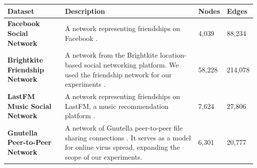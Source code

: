 \documentclass[9pt]{extarticle}
\begin{document}
\begin{table}[H]
    \centering
    \small
    \begin{tabularx}{\textwidth}{|l|X|l|l|}
        \hline
        \textbf{Dataset} & \textbf{Description} & \textbf{Nodes} & \textbf{Edges} \\ \hline
        \textbf{Facebook Social Network} \cite{facebookdata} & A network representing friendships on Facebook \cite{leskovec2012learning}. & 4,039 & 88,234 \\ \hline
        \textbf{Brightkite Friendship Network} \cite{brightkitedata} & A network from the Brightkite location-based social networking platform. We used the friendship network for our experiments \cite{cho2011friendship}. & 58,228 & 214,078 \\ \hline
        \textbf{LastFM Music Social Network} \cite{lastfmdata} & A network representing friendships on LastFM, a music recommendation platform \cite{feather}. & 7,624 & 27,806 \\ \hline
        \textbf{Gnutella Peer-to-Peer Network} \cite{gnutelladata} & A network of Gnutella peer-to-peer file sharing connections \cite{leskovec2007graph, ripeanu2002mapping}. It serves as a model for online virus spread, expanding the scope of our experiments. & 6,301 & 20,777 \\ \hline
    \end{tabularx}
\end{table}


\end{document}

